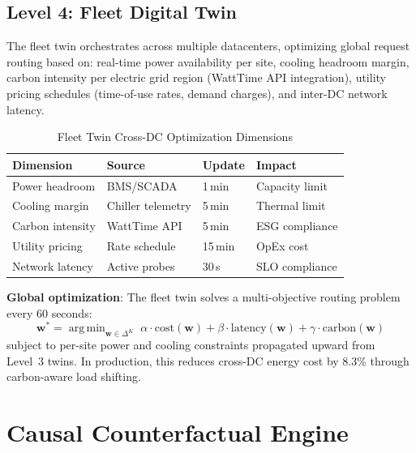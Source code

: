 \documentclass[conference,10pt]{IEEEtran}
\DeclareMathOperator*{\argmin}{arg\,min}
\begin{document}
\subsection{Level 4: Fleet Digital Twin}

The fleet twin orchestrates across multiple datacenters, optimizing global request routing based on: real-time power availability per site, cooling headroom margin, carbon intensity per electric grid region (WattTime API integration), utility pricing schedules (time-of-use rates, demand charges), and inter-DC network latency.

\begin{table}[!htbp]
\caption{Fleet Twin Cross-DC Optimization Dimensions}
\label{tab:fleet}
\centering\scriptsize
\begin{tabular}{@{}llll@{}}
\toprule
\textbf{Dimension} & \textbf{Source} & \textbf{Update} & \textbf{Impact} \\
\midrule
Power headroom & BMS/SCADA & 1\,min & Capacity limit \\
Cooling margin & Chiller telemetry & 5\,min & Thermal limit \\
Carbon intensity & WattTime API & 5\,min & ESG compliance \\
Utility pricing & Rate schedule & 15\,min & OpEx cost \\
Network latency & Active probes & 30\,s & SLO compliance \\
\bottomrule
\end{tabular}
\end{table}

\textbf{Global optimization}: The fleet twin solves a multi-objective routing problem every 60 seconds:
\begin{equation}
\mathbf{w}^{*} = \argmin_{\mathbf{w} \in \Delta^{K}} \; \alpha \cdot \text{cost}(\mathbf{w}) + \beta \cdot \text{latency}(\mathbf{w}) + \gamma \cdot \text{carbon}(\mathbf{w})
\end{equation}
subject to per-site power and cooling constraints propagated upward from Level~3 twins. In production, this reduces cross-DC energy cost by 8.3\% through carbon-aware load shifting.

\section{Causal Counterfactual Engine}
\label{sec:causal}
\end{document}
